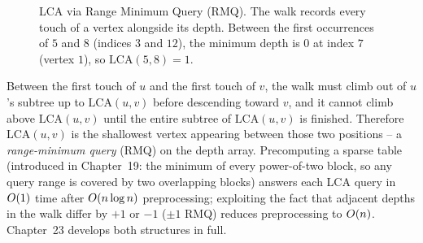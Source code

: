 \begin{figure}[htbp]
\centering
{}
\caption{LCA via Range Minimum Query (RMQ). The walk records every touch of a vertex alongside its depth. Between the first occurrences of $5$ and $8$ (indices $3$ and $12$), the minimum depth is $0$ at index $7$ (vertex $1$), so $\mathrm{LCA}(5,8)=1$.}
\label{ch21:fig-lca}
\end{figure}

Between the first touch of $u$ and the first touch of $v$, the walk must climb out of $u$'s subtree up to $\mathrm{LCA}(u,v)$ before descending toward $v$, and it cannot climb above $\mathrm{LCA}(u,v)$ until the entire subtree of $\mathrm{LCA}(u,v)$ is finished. Therefore $\mathrm{LCA}(u,v)$
is the shallowest vertex appearing between those two positions -- a \emph{range-minimum query} (RMQ) on the depth array. Precomputing a sparse table (introduced in Chapter~19: the minimum of every power-of-two block, so any query range is covered by two overlapping blocks) answers each LCA query in $O(1)$ time after $O(n\log n)$ preprocessing; exploiting the fact that adjacent depths in the walk differ by $+1$ or $-1$ ($\pm 1$ RMQ) reduces preprocessing to $O(n)$. Chapter~23 develops both structures in full.

